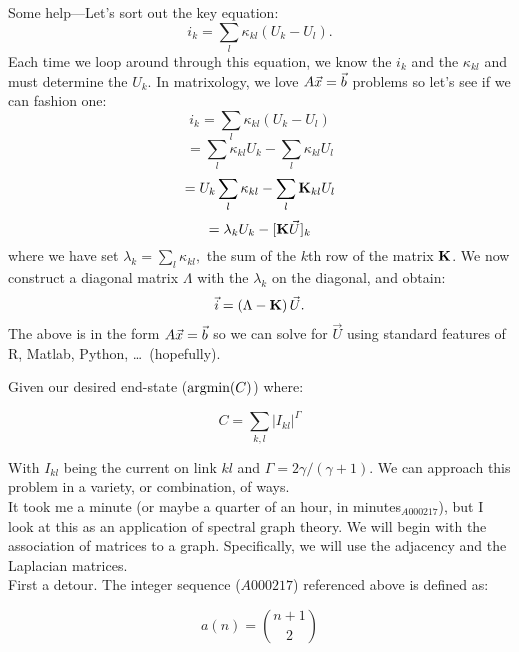 \begin{enumerate}
\begin{enumerate}

    Some help---Let's sort out the key equation:
    $$
    i_{k}
    =
    \sum_{l}
    \kappa_{kl}(U_{k}-U_{l}).
    $$
    Each time we loop around through
    this equation, we know the $i_{k}$ and the $\kappa_{kl}$
    and must determine the $U_{k}$.  
    In matrixology, we love $A\vec{x}=\vec{b}$ problems so let's see
    if we can fashion one:
    $$
    i_{k}
    =
    \sum_{l}
    \kappa_{kl}(U_{k}-U_{l})
    $$
    $$
    =
    \sum_{l}
    \kappa_{kl} U_{k}
    -
    \sum_{l}
    \kappa_{kl} U_{l}
    $$
    $$
    =
    U_{k}
    \sum_{l}
    \kappa_{kl}
    -
    \sum_{l}
    \mathbf{K}_{kl} U_{l}
    $$
    $$
    =
    \lambda_{k}
    U_{k}
    -
    [
      \mathbf{K} \vec{U}
    ]_k
    $$
    where we have 
    set 
    $
    \lambda_{k}
    =
    \sum_{l}
    \kappa_{kl},
    $
    the sum of the $k$th row of the matrix $\mathbf{K}$.
    We now construct a diagonal matrix $\Lambda$ with
    the $\lambda_{k}$ on the diagonal, and obtain:
    $$
    \vec{i}
    =
    \left(
    \Lambda
    -
    \mathbf{K}
    \right)
    \vec{U}.
    $$
    The above is in the form $A\vec{x}=\vec{b}$ so we can
    solve for $\vec{U}$ using standard features
    of R, Matlab, Python, \ldots\ (hopefully).

    
   \solutionstart

   Given our desired end-state ($\textnormal{argmin}{\left(C\right)}$) where:
   
   $$
   C 
   = 
   \sum_{k,l} 
   \left| 
   I_{kl}
   \right|^{\Gamma}
   $$
   
   With $I_{kl}$ being the current on link $kl$ and $\Gamma = 2\gamma/(\gamma+1)$.
   We can approach this problem in a variety, or combination, of ways.\\

   It took me a minute (or maybe a quarter of an hour, in minutes$_{A000217}$),
   but I look at this as an application of spectral graph theory.
   We will begin with the association of matrices to a graph.
   Specifically, we will use the adjacency and the Laplacian matrices.\\

   First a detour. The integer sequence ($A000217$) referenced above is defined as:

   \begin{equation}
        a(n) = \binom{n+1}{2}
   \end{equation}


\end{enumerate}
\end{enumerate}
